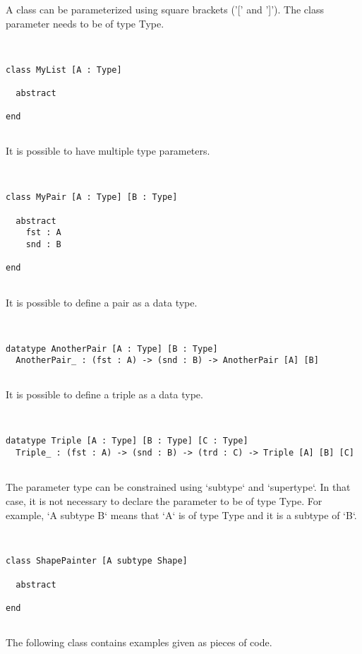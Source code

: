 \documentclass[12pt,a4paper]{article}
\begin{document}
A class can be parameterized using square brackets ('[' and ']').
 The class parameter needs to be of type Type.


\begin{lstlisting}


class MyList [A : Type]

  abstract

end


\end{lstlisting}

It is possible to have multiple type parameters.


\begin{lstlisting}


class MyPair [A : Type] [B : Type]

  abstract
    fst : A
    snd : B

end


\end{lstlisting}

It is possible to define a pair as a data type.


\begin{lstlisting}


datatype AnotherPair [A : Type] [B : Type]
  AnotherPair_ : (fst : A) -> (snd : B) -> AnotherPair [A] [B]


\end{lstlisting}

It is possible to define a triple as a data type.


\begin{lstlisting}


datatype Triple [A : Type] [B : Type] [C : Type]
  Triple_ : (fst : A) -> (snd : B) -> (trd : C) -> Triple [A] [B] [C]


\end{lstlisting}

The parameter type can be constrained using `subtype` and `supertype`.
 In that case, it is not necessary to declare the parameter to be of type Type.
 For example, `A subtype B` means that `A` is of type Type and it is a subtype of `B`.


\begin{lstlisting}


class ShapePainter [A subtype Shape]

  abstract

end


\end{lstlisting}

The following class contains examples given as pieces of code.
\end{document}
